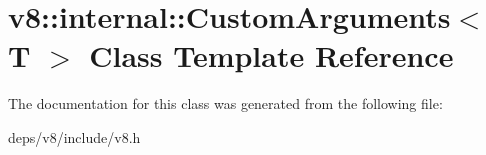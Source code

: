 \hypertarget{classv8_1_1internal_1_1_custom_arguments}{}\section{v8\+:\+:internal\+:\+:Custom\+Arguments$<$ T $>$ Class Template Reference}
\label{classv8_1_1internal_1_1_custom_arguments}


The documentation for this class was generated from the following file\+:\begin{DoxyCompactItemize}
\item 
deps/v8/include/v8.\+h\end{DoxyCompactItemize}
